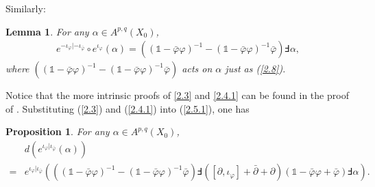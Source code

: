 \documentclass[12pt]{amsart}
\numberwithin{equation}{section}
\newtheorem{proposition}[theorem]{Proposition}
\newtheorem{lemma}  [theorem]     {Lemma}
\renewcommand{\1}{\mathds{1}}
\renewcommand{\>}{\rightarrow}
\newcommand{\p}{\partial}
\def\p{\partial}
\def\b{\bar}
\begin{document}
Similarly:
\begin{lemma} For any $\alpha\in A^{p,q}(X_0)$,
 \begin{align}\label{2.4.1}
   e^{-\iota_{\varphi}|-\iota_{\b{\varphi}}}\circ e^{\iota_{\varphi}}(\alpha)=\left((\1-\b{\varphi}\varphi)^{-1}-(\1-\b{\varphi}\varphi)^{-1}\b{\varphi}\right)\Finv\alpha,
 \end{align}
 where $\left((\1-\b{\varphi}\varphi)^{-1}-(\1-\b{\varphi}\varphi)^{-1}\b{\varphi}\right)$ acts on $\alpha$ just as
 (\ref{2.8}).
\end{lemma}
Notice that the more intrinsic proofs of \eqref{2.3} and
\eqref{2.4.1} can be found in the proof of \cite[Proposition
2.2]{RZ15}.
 Substituting (\ref{2.3}) and (\ref{2.4.1}) into (\ref{2.5.1}), one has
\begin{proposition} For any $\alpha\in A^{p,q}(X_0)$,
\begin{equation}
 \begin{aligned}\label{2.7}
    &d(e^{\iota_{\varphi}|\iota_{\b{\varphi}}}(\alpha))\\=&
    e^{\iota_{\varphi}|\iota_{\b{\varphi}}}\left(\left((\1-\b{\varphi}\varphi)^{-1}-(\1-\b{\varphi}\varphi)^{-1}\b{\varphi}\right)\Finv\left([\p,\iota_{\varphi}]
    +\b{\p}+\p\right)(\1-\b{\varphi}\varphi+\b{\varphi})\Finv\alpha\right).
 \end{aligned}
\end{equation}
\end{proposition}
\end{document}
